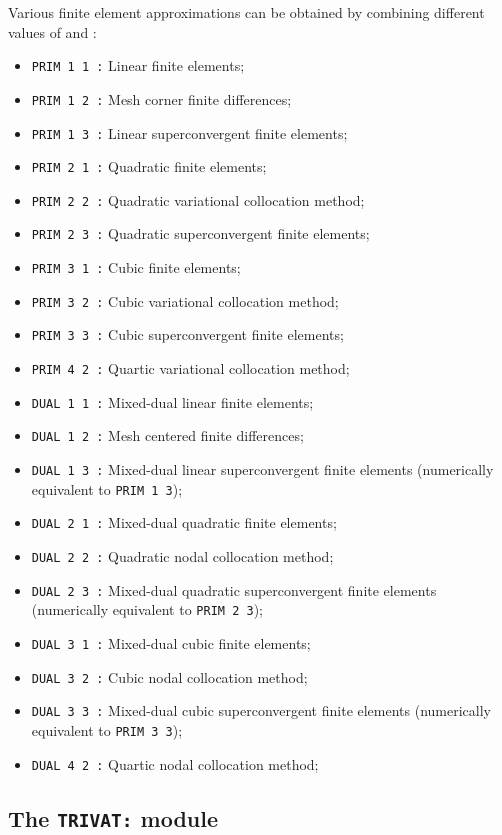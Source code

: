 Various finite element approximations can be obtained by combining different values of  and :
\begin{itemize}
\item {\tt PRIM 1 1~:} Linear finite elements;
\item {\tt PRIM 1 2~:} Mesh corner finite differences;
\item {\tt PRIM 1 3~:} Linear superconvergent finite elements;
\item {\tt PRIM 2 1~:} Quadratic finite elements;
\item {\tt PRIM 2 2~:} Quadratic variational collocation method;
\item {\tt PRIM 2 3~:} Quadratic superconvergent finite elements;
\item {\tt PRIM 3 1~:} Cubic finite elements;
\item {\tt PRIM 3 2~:} Cubic variational collocation method;
\item {\tt PRIM 3 3~:} Cubic superconvergent finite elements;
\item {\tt PRIM 4 2~:} Quartic variational collocation method;
\item {\tt DUAL 1 1~:} Mixed-dual linear finite elements;
\item {\tt DUAL 1 2~:} Mesh centered finite differences;
\item {\tt DUAL 1 3~:} Mixed-dual linear superconvergent finite elements (numerically equivalent to {\tt PRIM~1~3});
\item {\tt DUAL 2 1~:} Mixed-dual quadratic finite elements;
\item {\tt DUAL 2 2~:} Quadratic nodal collocation method;
\item {\tt DUAL 2 3~:} Mixed-dual quadratic superconvergent finite elements (numerically equivalent to {\tt PRIM~2~3});
\item {\tt DUAL 3 1~:} Mixed-dual cubic finite elements;
\item {\tt DUAL 3 2~:} Cubic nodal collocation method;
\item {\tt DUAL 3 3~:} Mixed-dual cubic superconvergent finite elements (numerically equivalent to {\tt PRIM~3~3});
\item {\tt DUAL 4 2~:} Quartic nodal collocation method;
\end{itemize}
\clearpage

\subsection{The {\tt TRIVAT:} module}\label{sect:trivact}

